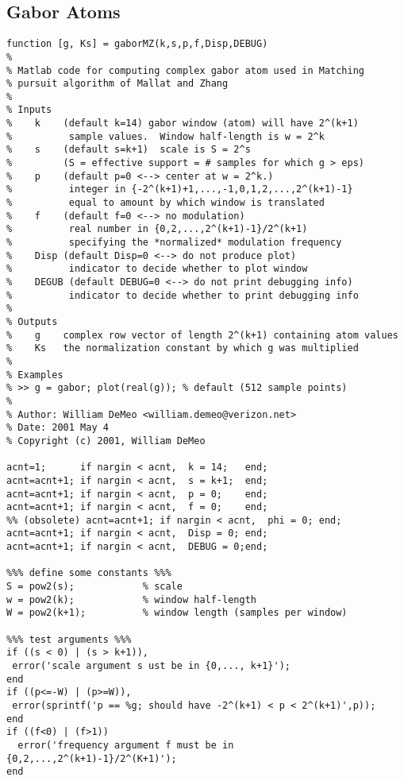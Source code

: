 \subsection{Gabor Atoms}\label{sec:gaborMZ}
\begin{small}\begin{verbatim}
function [g, Ks] = gaborMZ(k,s,p,f,Disp,DEBUG)
%
% Matlab code for computing complex gabor atom used in Matching
% pursuit algorithm of Mallat and Zhang
%
% Inputs
%    k    (default k=14) gabor window (atom) will have 2^(k+1) 
%          sample values.  Window half-length is w = 2^k
%    s    (default s=k+1)  scale is S = 2^s 
%         (S = effective support = # samples for which g > eps)
%    p    (default p=0 <--> center at w = 2^k.)
%          integer in {-2^(k+1)+1,...,-1,0,1,2,...,2^(k+1)-1} 
%          equal to amount by which window is translated
%    f    (default f=0 <--> no modulation)
%          real number in {0,2,...,2^(k+1)-1}/2^(k+1)
%          specifying the *normalized* modulation frequency
%    Disp (default Disp=0 <--> do not produce plot)
%          indicator to decide whether to plot window 
%    DEGUB (default DEBUG=0 <--> do not print debugging info)
%          indicator to decide whether to print debugging info
%
% Outputs
%    g    complex row vector of length 2^(k+1) containing atom values
%    Ks   the normalization constant by which g was multiplied
%
% Examples
% >> g = gabor; plot(real(g)); % default (512 sample points)
%
% Author: William DeMeo <william.demeo@verizon.net>
% Date: 2001 May 4
% Copyright (c) 2001, William DeMeo

acnt=1;      if nargin < acnt,  k = 14;   end;
acnt=acnt+1; if nargin < acnt,  s = k+1;  end;
acnt=acnt+1; if nargin < acnt,  p = 0;    end;
acnt=acnt+1; if nargin < acnt,  f = 0;    end;
%% (obsolete) acnt=acnt+1; if nargin < acnt,  phi = 0; end;
acnt=acnt+1; if nargin < acnt,  Disp = 0; end;
acnt=acnt+1; if nargin < acnt,  DEBUG = 0;end;

%%% define some constants %%%
S = pow2(s);            % scale
w = pow2(k);            % window half-length
W = pow2(k+1);          % window length (samples per window)

%%% test arguments %%%
if ((s < 0) | (s > k+1)),
 error('scale argument s ust be in {0,..., k+1}');
end
if ((p<=-W) | (p>=W)),
 error(sprintf('p == %g; should have -2^(k+1) < p < 2^(k+1)',p));
end
if ((f<0) | (f>1))
  error('frequency argument f must be in {0,2,...,2^(k+1)-1}/2^(K+1)');
end


\end{verbatim}
\end{small}

